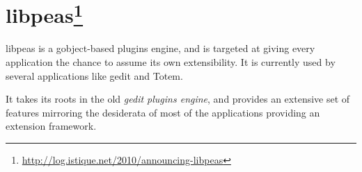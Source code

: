 
\section[libpeas]{libpeas\footnote{\url{http://log.istique.net/2010/announcing-libpeas}}}\label{sec:peas}

libpeas is a gobject-based plugins engine, and is targeted at giving every application the chance to assume its own extensibility. It is currently used by several \GNOME applications like gedit and Totem.

It takes its roots in the old \emph{gedit plugins engine}, and provides an extensive set of features mirroring the desiderata of most of the applications providing an extension framework.
